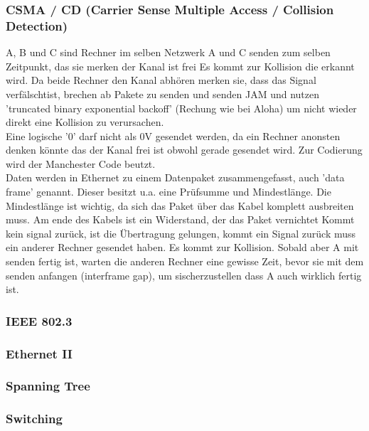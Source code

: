 \documentclass[a4paper,10pt]{scrartcl}
\begin{document}
        \subsubsection{CSMA / CD (Carrier Sense Multiple Access / Collision Detection)}
            A, B und C sind Rechner im selben Netzwerk
            A und C senden zum selben Zeitpunkt, das sie merken der Kanal ist frei
            Es kommt zur Kollision die erkannt wird. Da beide Rechner den Kanal abhören merken sie,
            dass das Signal verfälschtist, brechen ab Pakete zu senden und senden JAM  und nutzen 'truncated binary exponential backoff' (Rechung wie bei Aloha) um
            nicht wieder direkt eine Kollision zu verursachen. \\
            Eine logische '0' darf nicht als 0V gesendet werden, da ein Rechner anonsten denken könnte das der Kanal frei ist obwohl gerade gesendet wird. Zur Codierung wird
            der Manchester Code beutzt. \\
            Daten werden in Ethernet zu einem Datenpaket zusammengefasst, auch 'data frame' genannt. Dieser besitzt u.a. eine Prüfsumme und Mindestlänge.
            Die Mindestlänge ist wichtig, da sich das Paket über das Kabel komplett ausbreiten muss. Am ende des Kabels ist ein Widerstand, der das Paket vernichtet
            Kommt kein signal zurück, ist die Übertragung gelungen, kommt ein Signal zurück muss ein anderer Rechner gesendet haben. Es kommt zur Kollision.
            Sobald aber A mit senden fertig ist, warten die anderen Rechner eine gewisse Zeit, bevor sie mit dem senden anfangen (interframe gap), um sischerzustellen dass
            A auch wirklich fertig ist. 
        
        \subsubsection{IEEE 802.3}

        \subsubsection{Ethernet II}

        \subsubsection{Spanning Tree}

        \subsubsection{Switching}
\end{document}
